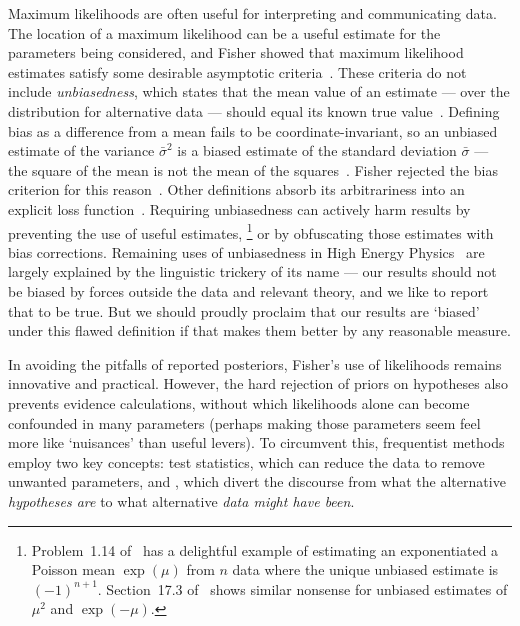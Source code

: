 Maximum likelihoods are often useful for interpreting and communicating data.
The location of a maximum likelihood can be a useful estimate for the
parameters being considered, and Fisher showed that maximum likelihood
estimates satisfy some desirable asymptotic
criteria~\cite{fisher1922estimators}.
These criteria do not include \emph{unbiasedness}, which states that the mean
value of an estimate --- over the distribution for alternative data --- should
equal its known true value~\cite{
sheynin1989aa,
Neyman1937Outline,
pdg2022ynf
}.
Defining bias as a difference from a mean fails to be coordinate-invariant,
so an unbiased estimate of the variance $\bar{\sigma}^2$ is a biased
estimate of the standard deviation $\bar{\sigma}$ --- the square of the mean
is not the mean of the squares~\cite{barlow2019svl}.
Fisher rejected the bias criterion for this
reason~\cite{jaynes2003probability}.
Other definitions absorb its
arbitrariness into an explicit loss function~\cite{lehmann2005testing}.
Requiring unbiasedness can actively harm results by preventing the use of
useful estimates,%
\footnote{%
Problem~1.14 of~\cite{lehmann2005testing} has a delightful example of
estimating an exponentiated a Poisson mean $\exp(\mu)$ from $n$ data
where the unique unbiased estimate is $(-1)^{n + 1}$.
Section~17.3 of~\cite{jaynes2003probability} shows similar nonsense for
unbiased estimates of $\mu^2$ and $\exp(-\mu)$.%
}
or by obfuscating those estimates with bias corrections.
Remaining uses of unbiasedness in High Energy Physics~\cite{
pdg2022ynf,
Tullythesis,
lhcb2018563,
LHCb:2021trn,
LHCb:2015yax
}
are largely explained by the linguistic trickery of its name --- our
results should not be biased by forces outside the data and relevant theory,
and we like to report that to be true.
But we should proudly proclaim that our results are `biased' under this flawed
definition if that makes them better by any reasonable measure.

In avoiding the pitfalls of reported posteriors, Fisher's use of likelihoods
remains innovative and practical.
However, the hard rejection of priors on hypotheses also prevents evidence
calculations, without which likelihoods alone can become confounded in many
parameters
(perhaps making those parameters seem feel more like `nuisances'
than useful levers).
To circumvent this, frequentist methods employ two key concepts:
test statistics, which can reduce the data to remove unwanted parameters,
and \pvalues, which divert the discourse
from what the alternative \emph{hypotheses are}
to what alternative \emph{data might have been}.

